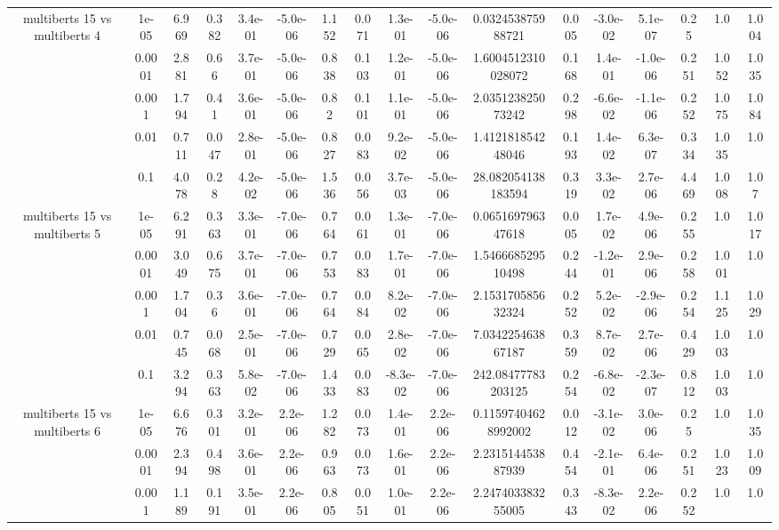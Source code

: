 \begin{tabular}{|c|c|c|c|c|c|c|c|c|c|c|c|c|c|c|c|c|}
\hline
\multirow{5}{*}{multiberts 15 vs multiberts 4} & 1e-05 & 6.969 & 0.382 & 3.4e-01 & -5.0e-06 & 1.152 & 0.071 & 1.3e-01 & -5.0e-06 & 0.032453875988721 & 0.005 & -3.0e-02 & 5.1e-07 & 0.25 & 1.0 & 1.004 \\
 & 0.0001 & 2.881 & 0.66 & 3.7e-01 & -5.0e-06 & 0.838 & 0.103 & 1.2e-01 & -5.0e-06 & 1.6004512310028072 & 0.168 & 1.4e-01 & -1.0e-06 & 0.251 & 1.052 & 1.035 \\
 & 0.001 & 1.794 & 0.41 & 3.6e-01 & -5.0e-06 & 0.82 & 0.101 & 1.1e-01 & -5.0e-06 & 2.035123825073242 & 0.298 & -6.6e-02 & -1.1e-06 & 0.252 & 1.075 & 1.084 \\
 & 0.01 & 0.711 & 0.047 & 2.8e-01 & -5.0e-06 & 0.827 & 0.083 & 9.2e-02 & -5.0e-06 & 1.412181854248046 & 0.193 & 1.4e-02 & 6.3e-07 & 0.334 & 1.035 & 1.0 \\
 & 0.1 & 4.078 & 0.28 & 4.2e-02 & -5.0e-06 & 1.536 & 0.056 & 3.7e-03 & -5.0e-06 & 28.082054138183594 & 0.319 & 3.3e-02 & 2.7e-06 & 4.469 & 1.008 & 1.07 \\
\hline
\multirow{5}{*}{multiberts 15 vs multiberts 5} & 1e-05 & 6.291 & 0.363 & 3.3e-01 & -7.0e-06 & 0.764 & 0.061 & 1.3e-01 & -7.0e-06 & 0.065169796347618 & 0.005 & 1.7e-02 & 4.9e-06 & 0.255 & 1.0 & 1.017 \\
 & 0.0001 & 3.049 & 0.675 & 3.7e-01 & -7.0e-06 & 0.753 & 0.083 & 1.7e-01 & -7.0e-06 & 1.546668529510498 & 0.244 & -1.2e-01 & 2.9e-06 & 0.258 & 1.001 & 1.0 \\
 & 0.001 & 1.704 & 0.36 & 3.6e-01 & -7.0e-06 & 0.764 & 0.084 & 8.2e-02 & -7.0e-06 & 2.153170585632324 & 0.252 & 5.2e-02 & -2.9e-06 & 0.254 & 1.125 & 1.029 \\
 & 0.01 & 0.745 & 0.068 & 2.5e-01 & -7.0e-06 & 0.729 & 0.065 & 2.8e-02 & -7.0e-06 & 7.034225463867187 & 0.359 & 8.7e-02 & 2.7e-06 & 0.429 & 1.003 & 1.0 \\
 & 0.1 & 3.294 & 0.363 & 5.8e-02 & -7.0e-06 & 1.433 & 0.083 & -8.3e-02 & -7.0e-06 & 242.08477783203125 & 0.254 & -6.8e-02 & -2.3e-07 & 0.812 & 1.003 & 1.0 \\
\hline
\multirow{5}{*}{multiberts 15 vs multiberts 6} & 1e-05 & 6.676 & 0.301 & 3.2e-01 & 2.2e-06 & 1.282 & 0.073 & 1.4e-01 & 2.2e-06 & 0.11597404628992002 & 0.012 & -3.1e-02 & 3.0e-06 & 0.25 & 1.0 & 1.035 \\
 & 0.0001 & 2.394 & 0.498 & 3.6e-01 & 2.2e-06 & 0.963 & 0.073 & 1.6e-01 & 2.2e-06 & 2.231514453887939 & 0.454 & -2.1e-01 & 6.4e-06 & 0.251 & 1.023 & 1.009 \\
 & 0.001 & 1.189 & 0.191 & 3.5e-01 & 2.2e-06 & 0.805 & 0.051 & 1.0e-01 & 2.2e-06 & 2.247403383255005 & 0.343 & -8.3e-02 & 2.2e-06 & 0.252 & 1.0 & 1.0 \\

\end{tabular}
